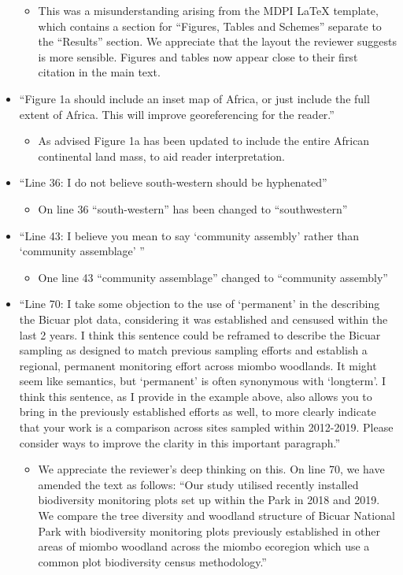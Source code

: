 \documentclass[a4paper]{letter}
\begin{document}
\begin{letter}{}
\begin{itemize}
\begin{itemize}
			\item{This was a misunderstanding arising from the MDPI LaTeX template, which contains a section for ``Figures, Tables and Schemes'' separate to the ``Results'' section. We appreciate that the layout the reviewer suggests is more sensible. Figures and tables now appear close to their first citation in the main text.}
		\end{itemize}
	\item{``Figure 1a should include an inset map of Africa, or just include the full extent of Africa. This will improve georeferencing for the reader.''}
		\begin{itemize}
			\item{As advised Figure 1a has been updated to include the entire African continental land mass, to aid reader interpretation.}
		\end{itemize}
	\item{``Line 36: I do not believe south-western should be hyphenated''}
		\begin{itemize}
			\item{On line 36 ``south-western'' has been changed to ``southwestern''}
		\end{itemize}
	\item{``Line 43: I believe you mean to say `community assembly' rather than `community assemblage' ''}
		\begin{itemize}
			\item{One line 43 ``community assemblage'' changed to ``community assembly''}
		\end{itemize}
	\item{``Line 70: I take some objection to the use of `permanent' in the describing the Bicuar plot data, considering it was established and censused within the last 2 years. I think this sentence could be reframed to describe the Bicuar sampling as designed to match previous sampling efforts and establish a regional, permanent monitoring effort across miombo woodlands. It might seem like semantics, but `permanent' is often synonymous with `longterm'. I think this sentence, as I provide in the example above, also allows you to bring in the previously established efforts as well, to more clearly indicate that your work is a comparison across sites sampled within 2012-2019. Please consider ways to improve the clarity in this important paragraph.''}
		\begin{itemize}
			\item{We appreciate the reviewer's deep thinking on this. On line 70, we have amended the text as follows: ``Our study utilised recently installed biodiversity monitoring plots set up within the Park in 2018 and 2019. We compare the tree diversity and woodland structure of Bicuar National Park with biodiversity monitoring plots previously established in other areas of miombo woodland across the miombo ecoregion which use a common plot biodiversity census methodology.''}

\end{itemize}
\end{itemize}
\end{letter}
\end{document}

